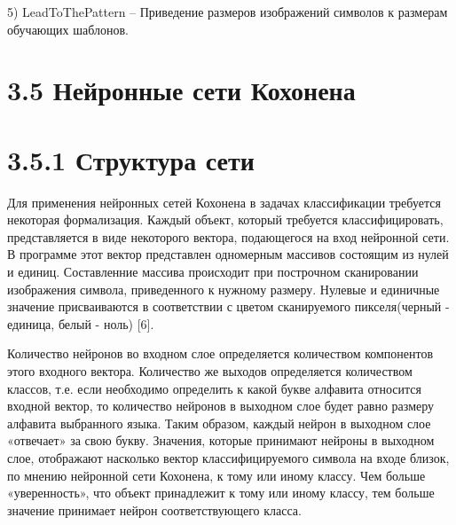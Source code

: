 \documentclass[14pt,a4paper]{extreport}
\begin{document}
  \hspace {4ex} 5) LeadToThePattern  – Приведение размеров изображений символов к размерам обучающих шаблонов.\
  
                  \section*{\normalsize\hspace{4ex}3.5 Нейронные сети Кохонена} 
                   
                  \section*{\normalsize\hspace{4ex}3.5.1 Структура сети}
                  
  \hspace {4ex} Для применения нейронных сетей Кохонена в задачах классификации требуется некоторая формализация. Каждый объект, который требуется классифицировать, представляется в виде некоторого вектора, подающегося на вход нейронной сети. В программе этот вектор представлен одномерным массивов состоящим из нулей и единиц. Составленние массива происходит при построчном сканировании изображения символа, приведенного к нужному размеру. Нулевые и единичные значение присваиваются в соответствии с цветом сканируемого пикселя(черный - единица, белый - ноль) [6].\
  
  \hspace {4ex} Количество нейронов во входном слое определяется количеством компонентов этого входного вектора. Количество же выходов определяется количеством классов, т.е. если необходимо определить к какой букве алфавита относится входной вектор, то количество нейронов в выходном слое будет равно размеру алфавита выбранного языка. Таким образом, каждый нейрон в выходном слое «отвечает» за свою букву. Значения, которые принимают нейроны в выходном слое, отображают насколько вектор классифицируемого символа на входе близок, по мнению нейронной сети Кохонена, к тому или иному классу. Чем больше «уверенность», что объект принадлежит к тому или иному классу, тем больше значение принимает нейрон соответствующего класса.\
  
\end{document}

